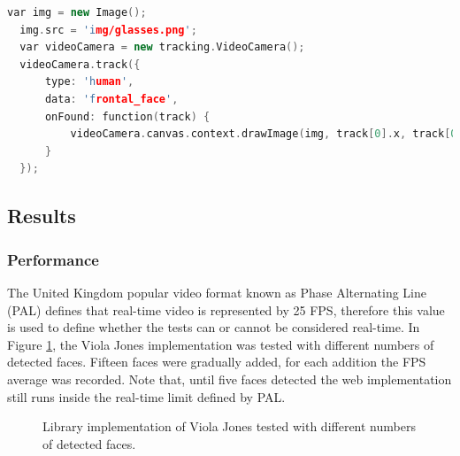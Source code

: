 \newpage

\begin{lstlisting}[language=C++,label={lst:viola},caption=Example of \textit{tracking.js} API of augmenting users faces with objects using Viola Jones face detection.]
  var img = new Image();
  img.src = 'img/glasses.png';
  var videoCamera = new tracking.VideoCamera();
  videoCamera.track({
      type: 'human',
      data: 'frontal_face',
      onFound: function(track) {
          videoCamera.canvas.context.drawImage(img, track[0].x, track[0].y, track[0].size, track[0].size);
      }
  });
\end{lstlisting}


\subsection{Results} %
\label{sub:evaluation:rapid_object_detection:results}

\subsubsection{Performance} %
\label{subsub:evaluation:rapid_object_detection:results:performance}

The United Kingdom popular video format known as Phase Alternating Line (PAL) \cite{PAL1962} defines that real-time video is represented by 25 FPS, therefore this value is used to define whether the tests can or cannot be considered real-time. In Figure \ref{figure:viola_fps}, the Viola Jones implementation was tested with different numbers of detected faces. Fifteen faces were gradually added, for each addition the FPS average was recorded. Note that, until five faces detected the web implementation still runs inside the real-time limit defined by PAL.

\begin{figure}[!htb]
  \centering
   \caption{Library implementation of Viola Jones tested with different numbers of detected faces.}
   \label{figure:viola_fps}
\end{figure}

